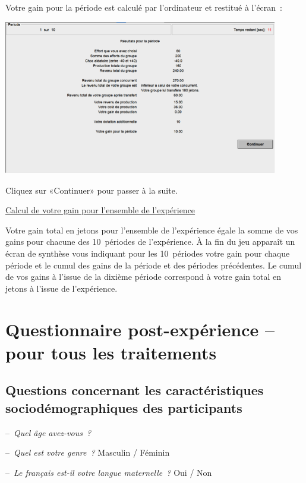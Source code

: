 \begin{Article}
\begin{refsection}[Lebourges]
\begin{appendices}

Votre gain pour la période est calculé par l'ordinateur et restitué à
l'écran~:

\vspace{.3cm}

\includegraphics[width = 0.9\textwidth]{05_fig14-annexII.png}

Cliquez sur «Continuer» pour passer à la suite.

\vspace{.3cm}
\ul{Calcul de votre gain pour l'ensemble de l'expérience}

\vspace{.2cm}
Votre gain total en jetons pour l'ensemble de l'expérience égale la
somme de vos gains pour chacune des 10~périodes de l'expérience. À la
fin du jeu apparaît un écran de synthèse vous indiquant pour les
10~périodes votre gain pour chaque période et le cumul des gains de la
période et des périodes précédentes. Le cumul de vos gains à l'issue de
la dixième période correspond à votre gain total en jetons à l'issue de
l'expérience.

\section{Questionnaire post-expérience --\\ pour tous les traitements}
\label{Annexe:Questionnaire}

\subsection{Questions concernant les caractéristiques sociodémographiques des participants}

--~\emph{Quel âge avez-vous~?}

--~\emph{Quel est votre genre~?} Masculin / Féminin

--~\emph{Le français est-il votre langue maternelle~?} Oui / Non


\end{appendices}
\end{refsection}
\end{Article}
